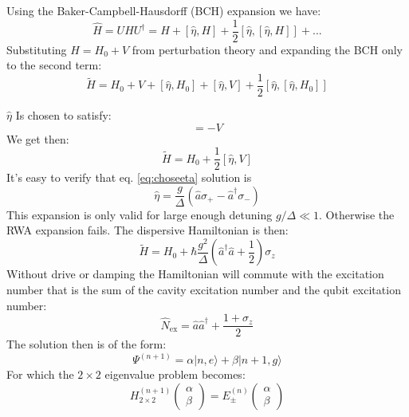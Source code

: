 \documentclass[12pt]{article}
\numberwithin{equation}{subsection}
\newcommand\page[1]{
{
}
}
\begin{document}
Using the Baker-Campbell-Hausdorff (BCH) expansion we have:
\begin{equation}
    \hat H = UHU^\dagger = H + [\hat \eta, H] + \frac{1}{2} [\hat \eta , [\hat \eta, H]]+ ...
\end{equation}
Substituting $H= H_0+V$ from perturbation theory and expanding the BCH only to the second term:
\begin{equation}
    \tilde H =H_0 + V+[\hat \eta, H_0]+[\hat \eta, V] + \frac{1}{2} [\hat \eta , [\hat \eta, H_0]]
\end{equation}

\page{78/85}

$\hat \eta$ Is chosen to satisfy:
\begin{equation}
  [\hat \eta, H_0] = -V  
  \label{eq:choseeta}
\end{equation}
We get then:
\begin{equation}
    \tilde H = H_0 + \frac{1}{2} [\hat \eta, V]
\end{equation}
It's easy to verify that eq. \ref{eq:choseeta} solution is
\begin{equation}
    \hat \eta = \frac{g}{\Delta} (\hat a \sigma_+ - \hat a^\dagger \sigma_-)
\end{equation}
This expansion is only valid for large enough detuning $g/\Delta \ll 1$. Otherwise the RWA expansion fails. The dispersive Hamiltonian is then:
\begin{equation}
    \tilde H = H_0 + \hbar \frac{g^2}{\Delta} \left( \hat a ^\dagger \hat a + \frac{1}{2} \right ) \sigma_z
    \label{eq:dispersiveH}
\end{equation}
Without drive or damping the Hamiltonian will commute with the excitation number that is the sum of the cavity excitation number and the qubit excitation number:
\begin{equation}
    \hat N _{\textrm{ex}} = \hat a \hat a ^\dagger + \frac{1+\sigma_z}{2}
\end{equation}
The solution then is of the form:
\begin{equation}
    \Psi^{(n+1)} = \alpha |n,e\rangle + \beta | n+1, g\rangle
\end{equation}
For which the $2\times 2$ eigenvalue problem becomes:
\begin{equation}
    H^{(n+1)}_{2\times 2} \begin{pmatrix}
    \alpha \\
    \beta
    \end{pmatrix}
    =E^{(n)}_\pm \begin{pmatrix}
    \alpha \\
    \beta
    \end{pmatrix}
\end{equation}
\end{document}
